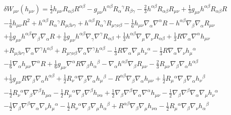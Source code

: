 \begin{eqnarray}
&&\delta W_{\mu\nu}(h_{\mu\nu})=\tfrac{1}{2} h_{\mu \nu} R_{\alpha \beta} R^{\alpha \beta} -  g_{\mu \nu} h^{\alpha \beta} R_{\alpha}{}^{\gamma} R_{\beta \gamma} -  \tfrac{2}{3} h^{\alpha \beta} R_{\alpha \beta} R_{\mu \nu} + \tfrac{1}{3} g_{\mu \nu} h^{\alpha \beta} R_{\alpha \beta} R
\nonumber\\
&& -  \tfrac{1}{6} h_{\mu \nu} R^2 
+ h^{\alpha \beta} R_{\alpha}{}^{\gamma} R_{\mu \beta \nu \gamma} + h^{\alpha \beta} R_{\alpha}{}^{\gamma} R_{\mu \gamma \nu \beta} -  \tfrac{1}{6} h_{\mu \nu} \nabla_{\alpha}\nabla^{\alpha}R -  h^{\alpha \beta} \nabla_{\beta}\nabla_{\alpha}R_{\mu \nu} 
\nonumber\\
&&+ \tfrac{1}{6} g_{\mu \nu} h^{\alpha \beta} \nabla_{\beta}\nabla_{\alpha}R + \tfrac{1}{6} g_{\mu \nu} h^{\alpha \beta} \nabla_{\gamma}\nabla^{\gamma}R_{\alpha \beta} 
+ \tfrac{1}{3} h^{\alpha \beta} \nabla_{\mu}\nabla_{\nu}R_{\alpha \beta}
+\tfrac{1}{3} R \nabla_{\alpha}\nabla^{\alpha}h_{\mu \nu}
\nonumber\\
&& + R_{\mu \beta \nu \gamma} \nabla_{\alpha}\nabla^{\gamma}h^{\alpha \beta} + R_{\mu \gamma \nu \beta} \nabla_{\alpha}\nabla^{\gamma}h^{\alpha \beta} -  \tfrac{1}{3} R \nabla_{\alpha}\nabla_{\mu}h_{\nu}{}^{\alpha} -  \tfrac{1}{3} R \nabla_{\alpha}\nabla_{\nu}h_{\mu}{}^{\alpha} 
\nonumber\\
&&-  \tfrac{1}{6} \nabla_{\alpha}h_{\mu \nu} \nabla^{\alpha}R 
+ \tfrac{1}{6} g_{\mu \nu} \nabla^{\alpha}R \nabla_{\beta}h_{\alpha}{}^{\beta} -  \nabla_{\alpha}h^{\alpha \beta} \nabla_{\beta}R_{\mu \nu} -  \tfrac{2}{3} R_{\mu \nu} \nabla_{\beta}\nabla_{\alpha}h^{\alpha \beta} 
\nonumber\\
&&+ \tfrac{1}{3} g_{\mu \nu} R \nabla_{\beta}\nabla_{\alpha}h^{\alpha \beta} + \tfrac{1}{2} R_{\nu}{}^{\alpha} \nabla_{\beta}\nabla_{\alpha}h_{\mu}{}^{\beta} 
-  R^{\alpha \beta} \nabla_{\beta}\nabla_{\alpha}h_{\mu \nu} 
+ \tfrac{1}{2} R_{\mu}{}^{\alpha} \nabla_{\beta}\nabla_{\alpha}h_{\nu}{}^{\beta} 
\nonumber\\
&&-  \tfrac{1}{2} R_{\nu}{}^{\alpha} \nabla_{\beta}\nabla^{\beta}h_{\mu \alpha} -  \tfrac{1}{2} R_{\mu}{}^{\alpha} \nabla_{\beta}\nabla^{\beta}h_{\nu \alpha} + \tfrac{1}{2} \nabla_{\beta}\nabla^{\beta}\nabla_{\alpha}\nabla^{\alpha}h_{\mu \nu} 
-  \tfrac{1}{2} \nabla_{\beta}\nabla^{\beta}\nabla_{\alpha}\nabla_{\mu}h_{\nu}{}^{\alpha} 
\nonumber\\
&&
-  \tfrac{1}{2} \nabla_{\beta}\nabla^{\beta}\nabla_{\alpha}\nabla_{\nu}h_{\mu}{}^{\alpha} -  \tfrac{1}{2} R_{\nu}{}^{\alpha} \nabla_{\beta}\nabla_{\mu}h_{\alpha}{}^{\beta} + R^{\alpha \beta} \nabla_{\beta}\nabla_{\mu}h_{\nu \alpha} -  \tfrac{1}{2} R_{\mu}{}^{\alpha} \nabla_{\beta}\nabla_{\nu}h_{\alpha}{}^{\beta} 

\end{eqnarray}
